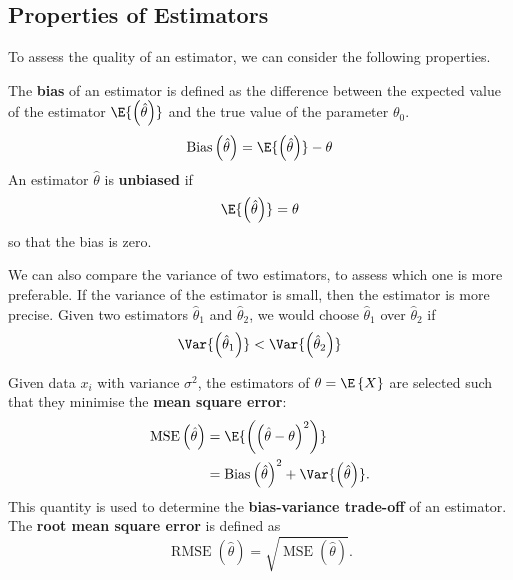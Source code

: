 \documentclass{article}
\begin{document}
\subsection{Properties of Estimators}
To assess the quality of an estimator, we can consider the following properties.
\begin{definition}[Bias]
    The \textbf{bias} of an estimator is defined as
    the difference between the expected value of the estimator \(\E{\left( \hat{\theta} \right)}\) and the true value of the parameter \(\theta_0\).
    \begin{equation*}
        \operatorname{Bias}\left( \hat{\theta} \right) = \E{\left( \hat{\theta} \right)} - \theta
    \end{equation*}
    An estimator \(\hat{\theta}\) is \textbf{unbiased} if
    \begin{equation*}
        \E{\left( \hat{\theta} \right)} = \theta
    \end{equation*}
    so that the bias is zero.
\end{definition}
We can also compare the variance of two estimators, to assess which one is more preferable.
If the variance of the estimator is small, then the estimator is more precise.
Given two estimators \(\hat{\theta}_1\) and \(\hat{\theta}_2\), we would choose \(\hat{\theta}_1\) over \(\hat{\theta}_2\) if
\begin{equation*}
    \Var{\left( \hat{\theta}_1 \right)} < \Var{\left( \hat{\theta}_2 \right)}
\end{equation*}
\begin{definition}
    Given data \(x_i\) with variance \(\sigma^2\), the estimators of \(\theta = \E\left\{ X \right\}\)
    are selected such that they minimise the \textbf{mean square error}:
    \begin{align*}
        \operatorname{MSE}\left( \hat{\theta} \right) & = \E{\left( \left( \hat{\theta} - \theta \right)^2 \right)}                             \\
                                                      & = \operatorname{Bias}\left( \hat{\theta} \right)^2 + \Var{\left( \hat{\theta} \right)}.
    \end{align*}
    This quantity is used to determine the \textbf{bias-variance trade-off} of an estimator.
    The \textbf{root mean square error} is defined as
    \begin{equation*}
        \operatorname{RMSE}\left( \hat{\theta} \right) = \sqrt{\operatorname{MSE}\left( \hat{\theta} \right)}.
    \end{equation*}
\end{definition}
\end{document}
